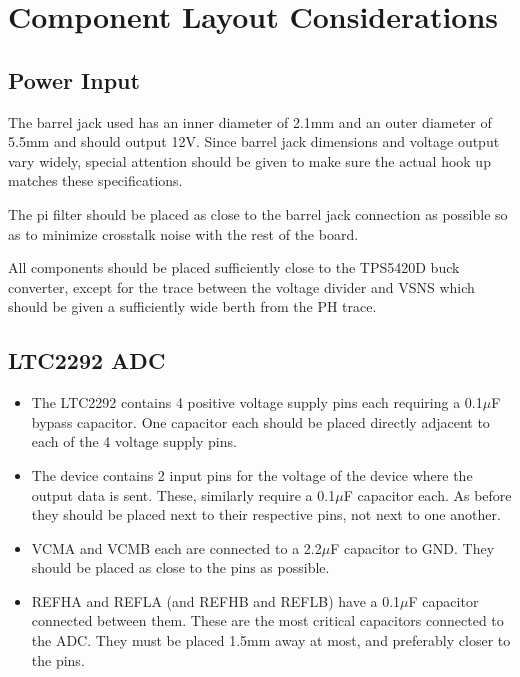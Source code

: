 \documentclass{default}
\begin{document}
\section{Component Layout Considerations}

\subsection{Power Input}
\label{sec:power-input-layout}

The barrel jack used has an inner diameter of 2.1mm and an outer diameter of 5.5mm and should output
12V. Since barrel jack dimensions and voltage output vary widely, special attention should be given
to make sure the actual hook up matches these specifications.

The pi filter should be placed as close to the barrel jack connection as possible so as to minimize
crosstalk noise with the rest of the board.

All components should be placed sufficiently close to the TPS5420D buck converter, except for the
trace between the voltage divider and VSNS which should be given a sufficiently wide berth from the
PH trace.

\subsection{LTC2292 ADC}

\begin{itemize}
\item The LTC2292 contains 4 positive voltage supply pins each requiring a 0.1$\mu$F bypass
        capacitor. One capacitor each should be placed directly adjacent to each of the 4 voltage
        supply pins.
\item The device contains 2 input pins for the voltage of the device where the output data is
        sent. These, similarly require a 0.1$\mu$F capacitor each. As before they should be placed
        next to their respective pins, not next to one another.
\item VCMA and VCMB each are connected to a 2.2$\mu$F capacitor to GND. They should be placed as
        close to the pins as possible.
\item REFHA and REFLA (and REFHB and REFLB) have a 0.1$\mu$F capacitor connected between them. These
        are the most critical capacitors connected to the ADC. They must be placed 1.5mm away at
        most, and preferably closer to the pins.
\end{itemize}
\end{document}
